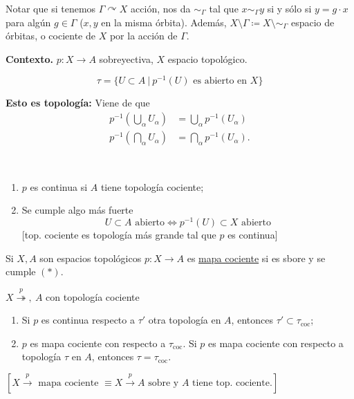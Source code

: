 Notar que si tenemos $\Gamma \curvearrowright X$ acción, nos da $\sim_{\Gamma}$ tal que $x \sim_{\Gamma} y$ si y sólo si $y = g\cdot x$ para algún $g \in \Gamma$ ($x,y$ en la misma órbita). Además, $X \setminus \Gamma \coloneq X \setminus \sim_{\Gamma}$ espacio de órbitas, o cociente de $X$ por la acción de $\Gamma$. \newline

\noindent \textbf{Contexto.} $p : X \to A$ sobreyectiva, $X$ espacio topológico.

\begin{definition}
	\[ \tau = \{ U \subset A \ \big| \ p^{-1}(U) \text{ es abierto en } X \} \]
\end{definition}

\noindent \textbf{Esto es topología:} Viene de que
\begin{align*}
	p^{-1}\left(\bigcup_{\alpha} U_{\alpha}\right) & = \bigcup_{\alpha} p^{-1}(U_{\alpha}) \\
	p^{-1}\left(\bigcap_{\alpha} U_{\alpha}\right) & = \bigcap_{\alpha} p^{-1}(U_{\alpha})
.\end{align*}

\begin{observe}~
	\begin{enumerate}
		\item $p$ es continua si $A$ tiene topología cociente;

		\item Se cumple algo más fuerte
		\[ U \subset A \text{ abierto} \iff p^{-1}(U) \subset X \text{ abierto} \tag{$*$} \]
		[top. cociente es topología más grande tal que $p$ es continua]
	\end{enumerate}
\end{observe}

\begin{definition}
	Si $X,A$ son espacios topológicos $p:X \to A$ es \underline{mapa cociente} si es sbore y se cumple $(*)$.
\end{definition}

\begin{observe}
	$X \stackrel{p}{\twoheadrightarrow},\ A$ con topología cociente
	\begin{enumerate}
		\item Si $p$ es continua respecto a $\tau'$ otra topología en $A$, entonces $\tau' \subset \tau_{\text{coc}}$;

		\item $p$ es mapa cociente con respecto a $\tau_{\text{coc}}$. Si $p$ es mapa cociente con respecto a topología $\tau$ en $A$, entonces $\tau = \tau_{\text{coc}}$.
	\end{enumerate}
	$ [ X \stackrel{p}{\to} \text{ mapa cociente } \equiv X \stackrel{p}{\to} A \text{ sobre y } A \text{ tiene top. cociente.} ] $
\end{observe}

